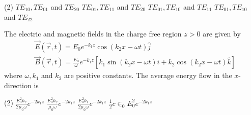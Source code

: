 \begin{enumerate}
\begin{minipage}{\textwidth}
\end{minipage}
\begin{tasks}(2)
	\task[\textbf{A.}] $T E_{10}, T E_{01}$ and $T E_{20}$
	\task[\textbf{B.}]$T E_{01}, T E_{11}$ and $T E_{20}$
	\task[\textbf{C.}]$T E_{01}, T E_{10}$ and $T E_{11}$
	\task[\textbf{D.}]$T E_{01}, T E_{10}$ and $T E_{22}$
\end{tasks}
\begin{minipage}{\textwidth}
	\item The electric and magnetic fields in the charge free region $z>0$ are given by
	$$
	\begin{aligned}
	&\vec{E}(\vec{r}, t)=E_{0} e^{-k_{1} z} \cos \left(k_{2} x-\omega t\right) \hat{j} \\
	&\vec{B}(\vec{r}, t)=\frac{E_{0}}{\omega} e^{-k_{1} z}\left[k_{1} \sin \left(k_{2} x-\omega t\right) \hat{i}+k_{2} \cos \left(k_{2} x-\omega t\right) \hat{k}\right]
	\end{aligned}
	$$
	where $\omega, k_{1}$ and $k_{2}$ are positive constants. The average energy flow in the $x$-direction is
\end{minipage}
\begin{tasks}(2)
	\task[\textbf{A.}] $\frac{E_{0}^{2} k_{2}}{2 \mu_{0} \omega} e^{-2 k_{1} z}$
	\task[\textbf{B.}]$\frac{E_{0}^{2} k_{2}}{\mu_{0} \omega} e^{-2 k_{1} z}$
	\task[\textbf{C.}]$\frac{E_{0}^{2} k_{1}}{2 \mu_{0} \omega} e^{-2 k_{1} z}$
	\task[\textbf{D.}]$\frac{1}{2} c \in_{0} E_{0}^{2} e^{-2 k_{1} z}$
\end{tasks}


\end{enumerate}
